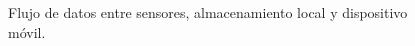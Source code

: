 \begin{figure}[H]
	\centering
	\caption[Integración extremo a extremo]{Flujo de datos entre sensores, almacenamiento local y dispositivo móvil.}
	\label{fig:cap3-integracion-e2e}
\end{figure}